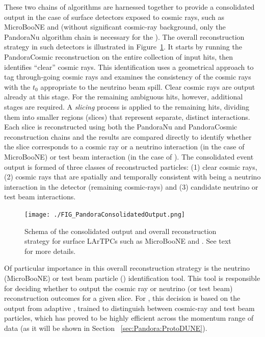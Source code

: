 These two chains of algorithms are harnessed together to provide a consolidated output in the case of surface detectors exposed to cosmic rays, such as MicroBooNE and  (without significant cosmic-ray background, only the PandoraNu algorithm chain is necessary for the ). The overall reconstruction strategy in such detectors is illustrated in Figure~\ref{consolidated_reco}. It starts by running the PandoraCosmic reconstruction on the entire collection of input hits, then identifies ``clear'' cosmic rays. This identification uses a geometrical approach to tag through-going cosmic rays and examines the consistency of the cosmic rays with the $t_{0}$ appropriate to the neutrino beam spill. Clear cosmic rays are output already at this stage. For the remaining ambiguous hits, however, additional stages are required. A \textit{slicing} process is applied to the remaining hits, dividing them into smaller regions (slices) that represent separate, distinct interactions. Each slice is reconstructed using both the PandoraNu and PandoraCosmic reconstruction chains and the results are compared directly to identify whether the slice corresponds to a cosmic ray or a neutrino interaction (in the case of MicroBooNE) or test beam interaction (in the case of ). The consolidated event output is formed of three classes of reconstructed particles: (1) clear cosmic rays, (2) cosmic rays that are spatially and temporally consistent with being a neutrino interaction in the detector (remaining cosmic-rays) and (3) candidate neutrino or test beam interactions.

\begin{figure}[!h!tbp]
\centering
\texttt{[image: ./FIG\_PandoraConsolidatedOutput.png]}
\caption[Schema of the  consolidated output and overall reconstruction strategy for surface LArTPCs]{Schema of the  consolidated output and overall reconstruction strategy for surface LArTPCs such as MicroBooNE and . See text for more details.}
\label{consolidated_reco}
\end{figure}

Of particular importance in this overall reconstruction strategy is the neutrino (MicroBooNE) or test beam particle () identification tool. This tool is responsible for deciding whether to output the cosmic ray or neutrino (or test beam) reconstruction outcomes for a given slice. For , this decision is based on the output from adaptive , trained to distinguish between cosmic-ray and test beam particles, which has proved to be highly efficient across the momentum range of  data (as it will be shown in Section ~\ref{sec:Pandora:ProtoDUNE}). %

